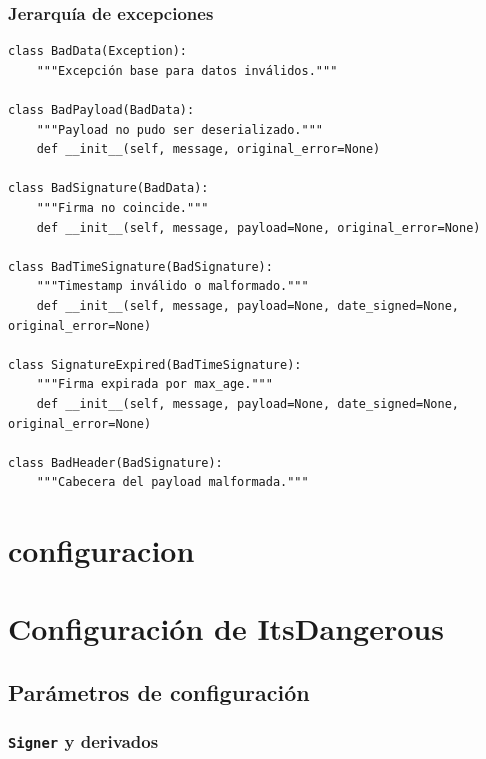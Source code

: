 \documentclass[11pt,a4paper]{article}
\begin{document}
\subsubsection*{Jerarquía de excepciones}


\begin{lstlisting}
class BadData(Exception):
    """Excepción base para datos inválidos."""

class BadPayload(BadData):
    """Payload no pudo ser deserializado."""
    def __init__(self, message, original_error=None)

class BadSignature(BadData):
    """Firma no coincide."""
    def __init__(self, message, payload=None, original_error=None)

class BadTimeSignature(BadSignature):
    """Timestamp inválido o malformado."""
    def __init__(self, message, payload=None, date_signed=None, original_error=None)

class SignatureExpired(BadTimeSignature):
    """Firma expirada por max_age."""
    def __init__(self, message, payload=None, date_signed=None, original_error=None)

class BadHeader(BadSignature):
    """Cabecera del payload malformada."""
\end{lstlisting}


\section*{configuracion}

\section*{Configuración de ItsDangerous}


\subsection*{Parámetros de configuración}


\subsubsection*{\texttt{Signer} y derivados}
\end{document}
